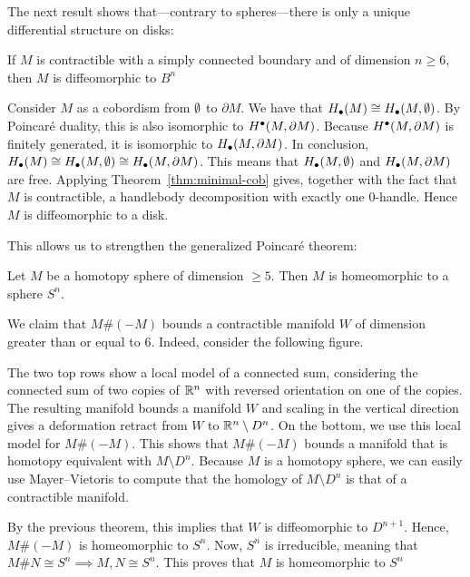 The next result shows that---contrary to spheres---there is only a unique differential structure on disks:
\begin{theorem}
    If $M$ is contractible with a simply connected boundary and of dimension $n \ge  6$, then $M$ is diffeomorphic to $B^{n}$
\end{theorem}
\begin{myproof}
    Consider $M$ as a cobordism from  $\emptyset$ to  $\partial M$.
    We have that  $H_\bullet(M) \cong H_\bullet(M, \emptyset)$.
    By Poincaré duality, this is also isomorphic to  $H^\bullet(M, \partial M)$.
    Because  $H^{\bullet}(M, \partial M)$ is finitely generated, it is isomorphic to $H_\bullet(M, \partial M)$.
    In conclusion, $H_\bullet(M) \cong H_\bullet(M, \emptyset) \cong H_\bullet(M, \partial M)$.
    This means that $H_\bullet(M, \emptyset)$ and  $H_\bullet(M, \partial M)$ are free.
    Applying Theorem~\ref{thm:minimal-cob} gives, together with the fact that $M$ is contractible, a handlebody decomposition with exactly one $0$-handle.
    Hence $M$ is diffeomorphic to a disk.
\end{myproof}

This allows us to strengthen the generalized Poincaré theorem:
\begin{theorem}
    Let $M$ be a homotopy sphere of dimension  $\ge  5$. Then $M$ is homeomorphic to a sphere $S^{n}$.
\end{theorem}
\begin{myproof}
    We claim that $M \# (-M)$ bounds a contractible manifold $W$ of dimension greater than or equal to $6$.
    Indeed, consider the following figure.
\begin{figure}[H]
    \centering
    \label{fig:connected-sum-homotopy-spheres}
\end{figure}
The two top rows show a local model of a connected sum, considering the connected sum of two copies of $\mathbb{R}^{n}$ with reversed orientation on one of the copies.
The resulting manifold bounds a manifold $W$ and scaling in the vertical direction gives a deformation retract from $W$ to  $ \mathbb{R}^{n} \setminus D^{n}$.
On the bottom, we use this local model for $ M \# (-M)$. This shows that $M \#(-M)$ bounds a manifold that is homotopy equivalent with  $M \setminus D^{n}$.
Because $M$ is a homotopy sphere, we can easily use Mayer--Vietoris to compute that the homology of $M \setminus D^{n}$ is that of a contractible manifold.

By the previous theorem, this implies that $W$ is diffeomorphic to $D^{n+1}$.
Hence, $M \#(-M)$ is homeomorphic to $S^{n}$.
Now, $S^{n}$ is irreducible, meaning that $M \# N \cong S^{n} \implies M, N \cong S^{n}$. This proves that $M$ is homeomorphic to  $S^{n}$
\end{myproof}

